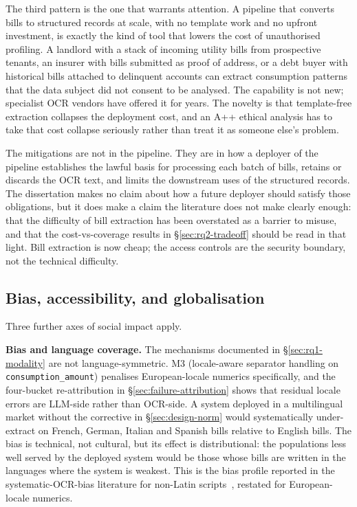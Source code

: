 The third pattern is the one that warrants attention. A pipeline that converts
bills to structured records at scale, with no template work and no upfront
investment, is exactly the kind of tool that lowers the cost of unauthorised
profiling. A landlord with a stack of incoming utility bills from prospective
tenants, an insurer with bills submitted as proof of address, or a debt buyer with
historical bills attached to delinquent accounts can extract consumption patterns
that the data subject did not consent to be analysed. The capability is not new;
specialist OCR vendors have offered it for years. The novelty is that template-free
extraction collapses the deployment cost, and an A++ ethical analysis has to take
that cost collapse seriously rather than treat it as someone else's problem.

The mitigations are not in the pipeline. They are in how a deployer of the
pipeline establishes the lawful basis for processing each batch of bills, retains
or discards the OCR text, and limits the downstream uses of the structured
records. The dissertation makes no claim about how a future deployer should
satisfy those obligations, but it does make a claim the literature does not make
clearly enough: that the difficulty of bill extraction has been overstated as a
barrier to misuse, and that the cost-vs-coverage results in
\S\ref{sec:rq2-tradeoff} should be read in that light. Bill extraction is now
cheap; the access controls are the security boundary, not the technical
difficulty.

\subsection{Bias, accessibility, and globalisation}

Three further axes of social impact apply.

\textbf{Bias and language coverage.} The mechanisms documented in
\S\ref{sec:rq1-modality} are not language-symmetric. M3 (locale-aware separator
handling on \texttt{consumption\_amount}) penalises European-locale numerics
specifically, and the four-bucket re-attribution in \S\ref{sec:failure-attribution}
shows that residual locale errors are LLM-side rather than OCR-side. A system
deployed in a multilingual market without the corrective in \S\ref{sec:design-norm}
would systematically under-extract on French, German, Italian and Spanish bills
relative to English bills. The bias is technical, not cultural, but its effect is
distributional: the populations less well served by the deployed system would be
those whose bills are written in the languages where the system is weakest. This
is the bias profile reported in the systematic-OCR-bias literature for non-Latin
scripts~\cite{nguyen2021post}, restated for European-locale numerics.

